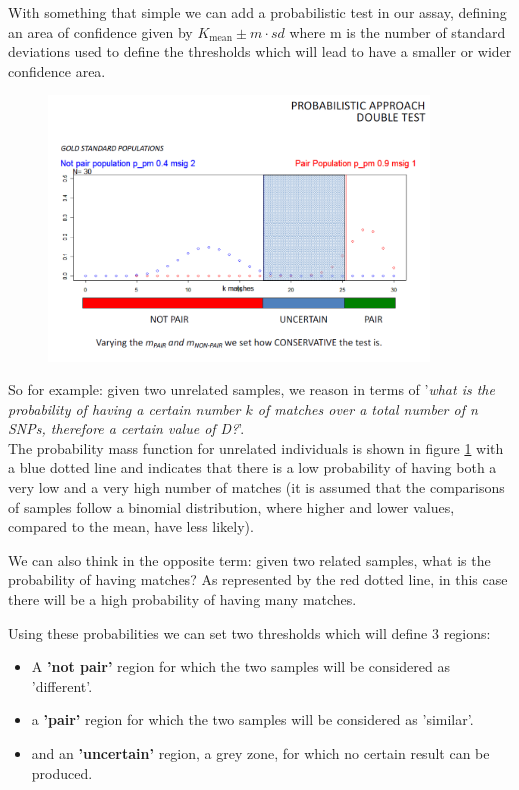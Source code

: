 With something that simple we can add a probabilistic test in our assay,
defining an area of confidence given by $K_{\text{mean}} \pm m \cdot sd$ where m
is the number of standard deviations used to define the thresholds which will
lead to have a smaller or wider confidence area. 

\begin{figure}[ht]
	\centering
	\includegraphics[width=0.9\textwidth]{Prob_test.PNG}
	\caption{\label{fig:prob_test}}
\end{figure}


\bigskip
So for example: given two unrelated samples, we reason in terms of  
'\textit{what is the probability of having a certain number $k$ of matches over
a total number of n SNPs, therefore a certain value of D?}'.\\
\noindent The probability mass function for unrelated individuals is shown in
figure \ref{fig:prob_test} with a blue dotted line and indicates that there is a
low probability of having both a very low and a very high number of matches (it
is assumed that the comparisons of samples follow a binomial distribution, where
higher and lower values, compared to the mean, have less likely). 

\noindent We can also think in the opposite term: given two related samples,
what is the probability of having  matches? As represented by the red dotted
line, in this case there will be a high probability of having many matches. 

Using these probabilities we can set two thresholds which will define 3 regions:
\begin{itemize}
	\item A \textbf{'not pair'} region for which the two samples will be
	considered as 'different'.
 	\item a \textbf{'pair'} region for which the two samples will be considered
 	as 'similar'.
	\item and an \textbf{'uncertain'} region, a grey zone, for which no certain
	result can be produced. 
\end{itemize}


